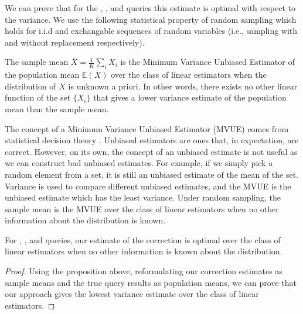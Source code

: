 We can prove that for the \sumfunc, \countfunc, and \avgfunc queries this estimate is optimal with respect to the variance.
We use the following statistical property of random sampling which holds for i.i.d and exchangable sequences of random variables (i.e., sampling with and without replacement respectively).
\begin{proposition}
The sample mean $\bar{X} = \frac{1}{K}\sum_i X_i$ is the Minimum Variance Unbiased Estimator of the population mean $\mathbb{E}(X)$ over the class of linear estimators when the distribution of $X$ is unknown a priori. In other words, there exists no other linear function of the set $\{ X_i \}$ that gives a lower variance estimate of the population mean than the sample mean.
\end{proposition}
The concept of a Minimum Variance Unbiased Estimator (MVUE) comes from statistical decision theory \cite{cox1979theoretical}.
Unbiased estimators are ones that, in expectation, are correct.
However, on its own, the concept of an unbiased estimate is not useful as we can construct bad unbiased estimates.
For example, if we simply pick a random element from a set, it is still an unbiased estimate of the mean of the set.
Variance is used to compare different unbiased estimates, and the MVUE is the unbiased estimate which has the least variance.
Under random sampling, the sample mean is the MVUE over the class of linear estimators when no other information about the distribution is known.
\begin{theorem}
For \sumfunc, \countfunc, and \avgfunc queries, our estimate of the correction is optimal over the class of linear estimators when no other information is known about the distribution. 
\end{theorem}
\begin{proof}
Using the proposition above, reformulating our correction estimates as sample means and the true query results as population means, we can prove that our approach gives the lowest variance estimate over the class of linear estimators.
\end{proof}